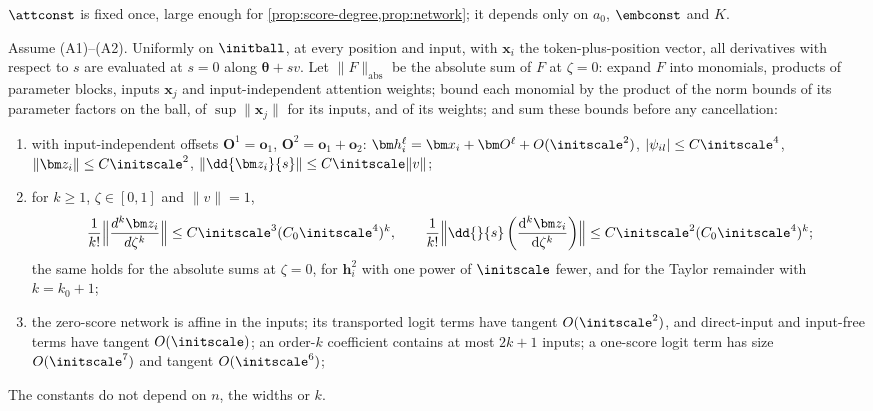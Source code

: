 $\attconst$ is fixed once, large enough for \cref{prop:score-degree,prop:network}; it depends only on $a_0$, $\embconst$ and $K$.

\label{app:network}

\begin{proposition}
\label{prop:network}
Assume (A1)--(A2). Uniformly on $\initball$, at every position and input, with $\bm x_i$ the token-plus-position vector,
all derivatives with respect to $s$ are evaluated at $s=0$ along $\bm\theta+sv$.
Let $\|F\|_{\mathrm{abs}}$ be the absolute sum of $F$ at $\zeta=0$: expand $F$ into monomials, products of
parameter blocks, inputs $\bm x_j$ and input-independent attention weights; bound each monomial by the product of the norm bounds of its
parameter factors on the ball, of $\sup\|\bm x_j\|$ for its inputs, and of its weights; and sum these bounds before any cancellation:
\begin{enumerate}[label=(\roman*),leftmargin=*,itemsep=3pt,topsep=4pt]
\item with input-independent offsets $\bm O^1=\bm o_1$, $\bm O^2=\bm o_1+\bm o_2$: $\bm h_i^\ell=\bm x_i+\bm O^\ell+O(\initscale^2)$, $|\psi_{il}|\le C\initscale^4$,
$\|\bm z_i\|\le C\initscale^2$, $\|\dd{\bm z_i}{s}\|\le C\initscale\|v\|$;
\item for $k\ge1$, $\zeta\in[0,1]$ and $\|v\|=1$,
\[
 \frac{1}{k!}\Bigl\|\frac{d^k\bm z_i}{d\zeta^k}\Bigr\|\le C\initscale^3(C_0\initscale^4)^k,\qquad
 \frac{1}{k!}\Bigl\|\dd{}{s}\left(\frac{\mathrm d^k\bm z_i}{\mathrm d\zeta^k}\right)\Bigr\|\le C\initscale^2(C_0\initscale^4)^k;
\]
the same holds for the absolute sums at $\zeta=0$, for $\bm h^2_i$ with one power of $\initscale$ fewer, and for the Taylor remainder with $k=k_0+1$;
\item the zero-score network is affine in the inputs; its transported logit terms have tangent $O(\initscale^2)$, and direct-input and
input-free terms have tangent $O(\initscale)$; an order-$k$ coefficient contains at most $2k+1$ inputs; a one-score logit term has size
$O(\initscale^7)$ and tangent $O(\initscale^6)$;
\end{enumerate}
The constants do not depend on $n$, the widths or $k$.
\end{proposition}

